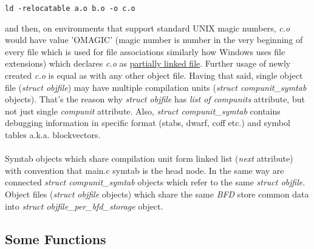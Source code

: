\documentclass{report}
\begin{document}
\begin{verbatim}
ld -relocatable a.o b.o -o c.o
\end{verbatim}
and then, on environments that support standard UNIX magic numbers, \textit{c.o} would have value 'OMAGIC' (magic number is number in the very beginning of every file which is used for file associations similarly how Windows uses file extensions) which declares \textit{c.o} as \underline{partially linked file}. Further usage of newly created \textit{c.o} is equal as with any other object file.
Having that said, single object file (\textit{struct objfile}) may have multiple compilation units (\textit{struct compunit\_symtab} objects). That's the reason why \textit{struct objfile} has \textit{list of compunits} attribute, but not just single \textit{compunit} attribute.
Also, \textit{struct compunit\_symtab} contains debugging information in specific format (stabs, dwarf, coff etc.) and symbol tables a.k.a. blockvectors. \\ \\
Symtab objects which share compilation unit form linked list (\textit{next} attribute) with convention that main.c symtab is the head node.
In the same way are connected \textit{struct compunit\_symtab} objects which refer to the same \textit{struct objfile}.
Object files (\textit{struct objfile} objects) which share the same \textit{BFD} store common data into \textit{struct objfile\_per\_bfd\_storage} object.
\subsection *{Some Functions}
\inputminted{c}{important_gdb_functions.c}
	
\end{document}
